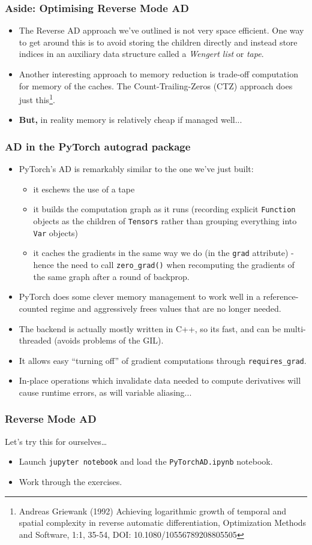 \documentclass{beamer}
\begin{document}
\begin{frame}
\frametitle{Aside: Optimising Reverse Mode AD}
\begin{itemize}
	\item<+-> The Reverse AD approach we've outlined is not very space efficient. One way to get around this is to avoid storing the children directly and instead store indices in an auxiliary data structure called a \emph{Wengert list} or \emph{tape}.
	\item<+-> Another interesting approach to memory reduction is trade-off computation for memory of the caches. The Count-Trailing-Zeros (CTZ) approach does just this\footnote{Andreas Griewank (1992) Achieving logarithmic growth of temporal and spatial complexity in reverse automatic differentiation, Optimization Methods and Software, 1:1, 35-54, DOI: 10.1080/10556789208805505}.
	\item<+-> \textbf{But,} in reality memory is relatively cheap if managed well...
\end{itemize}
\end{frame}

\begin{frame}
\frametitle{AD in the PyTorch autograd package}

\begin{itemize}
	\item<+-> PyTorch's AD is remarkably similar to the one we've just built: \begin{itemize}
		\item<+-> it eschews the use of a tape
		\item<+-> it builds the computation graph as it runs (recording explicit \lstinline!Function! objects as the children of \lstinline!Tensors! rather than grouping everything into \lstinline!Var! objects)
		\item<+-> it caches the gradients in the same way we do (in the \lstinline!grad! attribute) - hence the need to call \lstinline!zero_grad()! when recomputing the gradients of the same graph after a round of backprop.
	\end{itemize}
	\item<+-> PyTorch does some clever memory management to work well in a reference-counted regime and aggressively frees values that are no longer needed.
	\item<+-> The backend is actually mostly written in C++, so its fast, and can be multi-threaded (avoids problems of the GIL).
	\item<+-> It allows easy ``turning off'' of gradient computations through \lstinline!requires_grad!.
	\item<+-> In-place operations which invalidate data needed to compute derivatives will cause runtime errors, as will variable aliasing...
\end{itemize}
\end{frame}


\begin{frame}
\frametitle{Reverse Mode AD}

\begin{block}{Let's try this for ourselves\ldots}
\begin{itemize}
	\item Launch \lstinline!jupyter notebook! and load the \lstinline!PyTorchAD.ipynb! notebook.
	\item Work through the exercises.
\end{itemize}
\end{block}
\end{frame}
\end{document}
